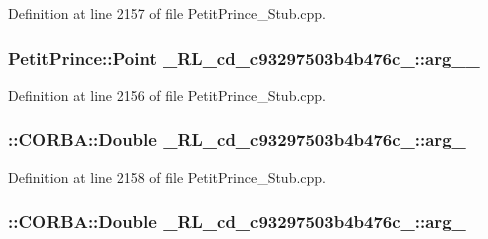 Definition at line 2157 of file Petit\+Prince\+\_\+\+Stub.\+cpp.

\subsubsection[{\texorpdfstring{arg\+\_\+1\+\_\+}{arg_1_}}]{\setlength{\rightskip}{0pt plus 5cm}Petit\+Prince\+::\+Point \+\_\+R\+L\+\_\+cd\+\_\+c93297503b4b476c\+\_\+::arg\+\_\+\_\+}\hypertarget{class__0_r_l__cd__c93297503b4b476c__31000000_abe834bb7ce68fa30fbf50962745bdd51}{}\label{class__0_r_l__cd__c93297503b4b476c__31000000_abe834bb7ce68fa30fbf50962745bdd51}


Definition at line 2156 of file Petit\+Prince\+\_\+\+Stub.\+cpp.

\subsubsection[{\texorpdfstring{arg\+\_\+2}{arg_2}}]{\setlength{\rightskip}{0pt plus 5cm}\+::C\+O\+R\+B\+A\+::\+Double \+\_\+R\+L\+\_\+cd\+\_\+c93297503b4b476c\+\_\+::arg\+\_}\hypertarget{class__0_r_l__cd__c93297503b4b476c__31000000_ad26a41851d02b94505f3e96984968453}{}\label{class__0_r_l__cd__c93297503b4b476c__31000000_ad26a41851d02b94505f3e96984968453}


Definition at line 2158 of file Petit\+Prince\+\_\+\+Stub.\+cpp.

\subsubsection[{\texorpdfstring{arg\+\_\+3}{arg_3}}]{\setlength{\rightskip}{0pt plus 5cm}\+::C\+O\+R\+B\+A\+::\+Double \+\_\+R\+L\+\_\+cd\+\_\+c93297503b4b476c\+\_\+::arg\+\_}\hypertarget{class__0_r_l__cd__c93297503b4b476c__31000000_a836a674a6af5f0de805e77e06cf63fd5}{}\label{class__0_r_l__cd__c93297503b4b476c__31000000_a836a674a6af5f0de805e77e06cf63fd5}


